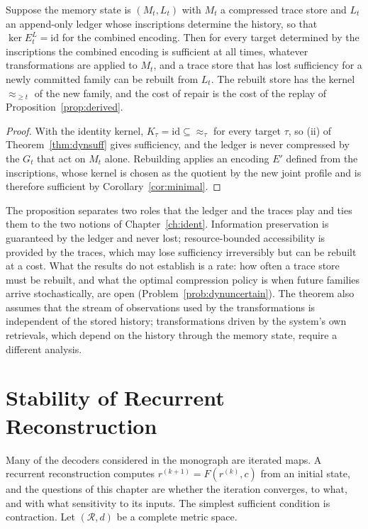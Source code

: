 \begin{proposition}\label{prop:ledgerrepair}
Suppose the memory state is $(M_t,L_t)$ with $M_t$ a compressed trace store and $L_t$ an append-only ledger whose inscriptions determine the history, so that $\ker E_t^{L}=\mathrm{id}$ for the combined encoding. Then for every target determined by the inscriptions the combined encoding is sufficient at all times, whatever transformations are applied to $M_t$, and a trace store that has lost sufficiency for a newly committed family can be rebuilt from $L_t$. The rebuilt store has the kernel $\approx_{\ge t}$ of the new family, and the cost of repair is the cost of the replay of Proposition~\ref{prop:derived}.
\end{proposition}

\begin{proof}
With the identity kernel, $K_\tau=\mathrm{id}\subseteq{\approx_\tau}$ for every target $\tau$, so (ii) of Theorem~\ref{thm:dynsuff} gives sufficiency, and the ledger is never compressed by the $G_t$ that act on $M_t$ alone. Rebuilding applies an encoding $E'$ defined from the inscriptions, whose kernel is chosen as the quotient by the new joint profile and is therefore sufficient by Corollary~\ref{cor:minimal}.
\end{proof}

The proposition separates two roles that the ledger and the traces play and ties them to the two notions of Chapter~\ref{ch:ident}. Information preservation is guaranteed by the ledger and never lost; resource-bounded accessibility is provided by the traces, which may lose sufficiency irreversibly but can be rebuilt at a cost. What the results do not establish is a rate: how often a trace store must be rebuilt, and what the optimal compression policy is when future families arrive stochastically, are open (Problem~\ref{prob:dynuncertain}). The theorem also assumes that the stream of observations used by the transformations is independent of the stored history; transformations driven by the system's own retrievals, which depend on the history through the memory state, require a different analysis.

\chapter{Stability of Recurrent Reconstruction}\label{ch:stability}

Many of the decoders considered in the monograph are iterated maps. A recurrent reconstruction computes $r^{(k+1)}=F(r^{(k)},c)$ from an initial state, and the questions of this chapter are whether the iteration converges, to what, and with what sensitivity to its inputs. The simplest sufficient condition is contraction. Let $(\mathcal R,d)$ be a complete metric space.

